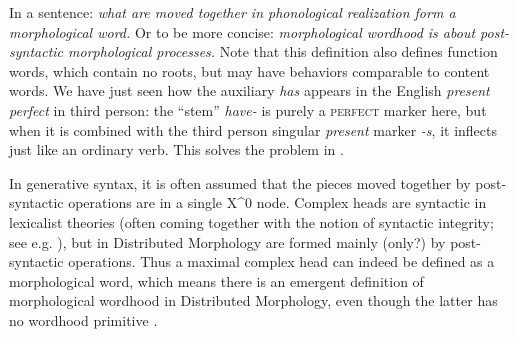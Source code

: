\documentclass[a4paper, oneside, scheme=plain, 12pt]{article}
\newcommand{\form}[1]{\emph{#1}}
\newcommand*{\category}[1]{\textsc{#1}}
\begin{document}
In a sentence: \form{what are moved together in phonological realization form a morphological word.}
Or to be more concise: \form{morphological wordhood is about post-syntactic morphological processes.}
Note that this definition also defines function words,
which contain no roots, but may have behaviors comparable to content words.
We have just seen how the auxiliary \form{has} appears in the English \form{present perfect} in third person:
the ``stem'' \form{have-} is purely a \category{perfect} marker here,
but when it is combined with the third person singular \form{present} marker \form{-s},
it inflects just like an ordinary verb.
This solves the problem in .

In generative syntax, it is often assumed that the pieces moved together by post-syntactic operations are in a single X^0 node.
Complex heads are syntactic in lexicalist theories (often coming together with the notion of syntactic integrity; see e.g. \citet{bickel2007free}), but in Distributed Morphology are formed mainly (only?) by post-syntactic operations.
Thus a maximal complex head can indeed be defined as a morphological word, which means there is an emergent definition of morphological wordhood in Distributed Morphology, even though the latter has no wordhood primitive \citep{embick2007linearization}.
\end{document}

